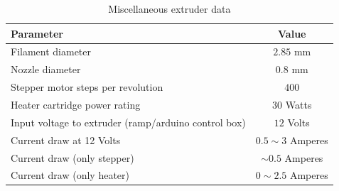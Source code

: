 \documentclass[10pt]{article}
\begin{document}
\begin{table}[h]
	\centering
	{
	\captionsetup{width=\linewidth}
	\caption{Miscellaneous extruder data}
	}
	\vspace{-0.6em}
	\setlength\tabcolsep{6pt} %
	\begin{tabular}{lc}
	\toprule
	Parameter & Value \\
	\midrule
	Filament diameter & $2.85$ mm  \\
	Nozzle diameter & $0.8$ mm \\
	Stepper motor steps per revolution & $400$ \\
	Heater cartridge power rating & $30$ Watts \\
	Input voltage to extruder (ramp/arduino control box) & $12$ Volts \\
	Current draw at 12 Volts & $0.5 \sim 3$ Amperes \\
	Current draw (only stepper) & $\sim 0.5$ Amperes \\
	Current draw (only heater)  & $0 \sim 2.5$ Amperes \\
	\bottomrule
	\end{tabular}
\end{table}

\newpage
\end{document}
